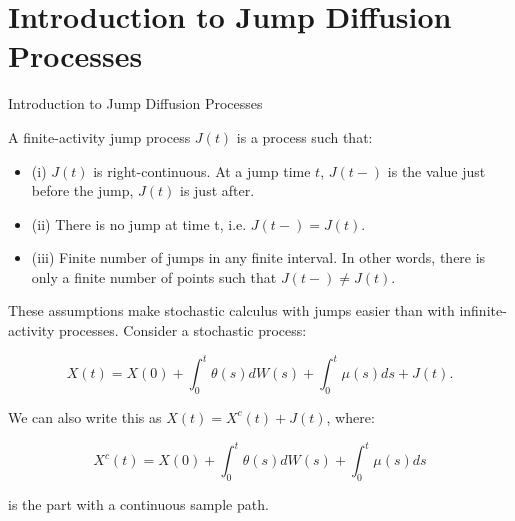 \documentclass{beamer}
\begin{document}
\section{Introduction to Jump Diffusion Processes}
\begin{frame}{Introduction to Jump Diffusion Processes}

    {\footnotesize \footnotesize
    \par A finite-activity jump process $J(t)$ is a process such that:
    \begin{itemize}
        \item (i) \( J(t) \) is right-continuous. 
        At a jump time \( t \), \( J(t-) \) is the value just before the jump, \( J(t) \) is just after.
        \item (ii) There is no jump at time t, i.e. \( J(t-) = J(t) \).
        \item (iii) Finite number of jumps in any finite interval. In other words, there is only a finite number of points such that \( J(t-) \neq J(t) \).
    \end{itemize}
    \vspace{1em}
    \par These assumptions make stochastic 
    calculus with jumps easier than with infinite-activity processes. Consider a stochastic process: 

        \[
        X(t) = X(0) + \int_{0}^{t} \theta(s) dW(s) + \int_{0}^{t} \mu(s) ds + J(t).
        \]

    \par We can also write this as $X(t) = X^{c}(t) + J(t)$, where:
    

    \[
    X^{c}(t) = X(0) + \int_{0}^{t} \theta(s) dW(s) + \int_{0}^{t} \mu(s) ds
    \]

    \par is the part with a continuous sample path.

    }
\end{frame}
\end{document}
